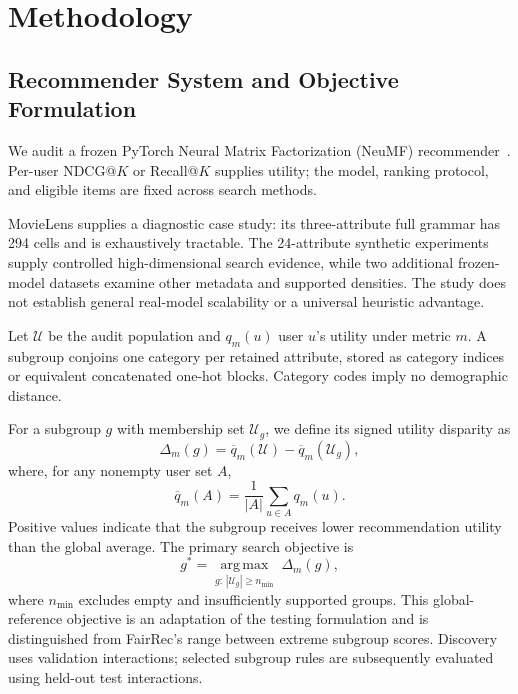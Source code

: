 \section{Methodology}
\label{sec:methodology}

\subsection{Recommender System and Objective Formulation}
We audit a frozen PyTorch Neural Matrix Factorization (NeuMF) recommender~\cite{he2017ncf}. Per-user NDCG@$K$ or Recall@$K$ supplies utility; the model, ranking protocol, and eligible items are fixed across search methods.

MovieLens supplies a diagnostic case study: its three-attribute full grammar has 294 cells and is exhaustively tractable. The 24-attribute synthetic experiments supply controlled high-dimensional search evidence, while two additional frozen-model datasets examine other metadata and supported densities. The study does not establish general real-model scalability or a universal heuristic advantage.

Let $\mathcal{U}$ be the audit population and $q_m(u)$ user $u$'s utility under metric $m$. A subgroup conjoins one category per retained attribute, stored as category indices or equivalent concatenated one-hot blocks. Category codes imply no demographic distance.

For a subgroup $g$ with membership set $\mathcal{U}_g$, we define its signed utility disparity as
\begin{equation}
\label{eq:utility-gap}
\Delta_m(g)=\overline{q}_m(\mathcal{U})-\overline{q}_m(\mathcal{U}_g),
\end{equation}
where, for any nonempty user set $A$,
\begin{equation}
\overline{q}_m(A)=\frac{1}{|A|}\sum_{u\in A}q_m(u).
\end{equation}
Positive values indicate that the subgroup receives lower recommendation utility than the global average. The primary search objective is
\begin{equation}
\label{eq:search-objective}
g^{*}=\underset{g:\,|\mathcal{U}_g|\geq n_{\min}}{\operatorname{arg\,max}}\;\Delta_m(g),
\end{equation}
where $n_{\min}$ excludes empty and insufficiently supported groups. This global-reference objective is an adaptation of the testing formulation and is distinguished from FairRec's range between extreme subgroup scores. Discovery uses validation interactions; selected subgroup rules are subsequently evaluated using held-out test interactions.

